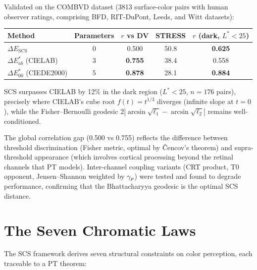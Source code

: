 \documentclass[12pt,a4paper]{article}
\begin{document}
\medskip

Validated on the COMBVD dataset (3813 surface-color pairs with human
observer ratings, comprising BFD, RIT-DuPont, Leeds, and Witt datasets):
\begin{center}
\begin{tabular}{lcccc}
\toprule
Method & Parameters & $r$ vs DV & STRESS & $r$ (dark, $L^*<25$) \\
\midrule
$\Delta E_{\mathrm{SCS}}$ & 0 & 0.500 & 50.8 & \textbf{0.625} \\
$\Delta E^*_{ab}$ (CIELAB) & 3 & \textbf{0.755} & 38.4 & 0.558 \\
$\Delta E^*_{00}$ (CIEDE2000) & 5 & \textbf{0.878} & 28.1 & \textbf{0.884} \\
\bottomrule
\end{tabular}
\end{center}
SCS surpasses CIELAB by 12\% in the dark region ($L^* < 25$,
$n = 176$ pairs), precisely where CIELAB's cube root $f(t) = t^{1/3}$
diverges (infinite slope at $t = 0$), while the Fisher--Bernoulli
geodesic $2|\arcsin\sqrt{\ell_1} - \arcsin\sqrt{\ell_2}|$ remains
well-conditioned.

The global correlation gap (0.500 vs 0.755) reflects the difference
between threshold discrimination (Fisher metric, optimal by
\v{C}encov's theorem) and supra-threshold appearance (which involves
cortical processing beyond the retinal channels that PT models).
Inter-channel coupling variants (CRT product, T0 opponent,
Jensen--Shannon weighted by $\gamma_{p}$) were tested and found to
degrade performance, confirming that the Bhattacharyya geodesic is the
optimal SCS distance.

\section{The Seven Chromatic Laws}
\label{sec:laws}

The SCS framework derives seven structural constraints on color
perception, each traceable to a PT theorem:
\end{document}
